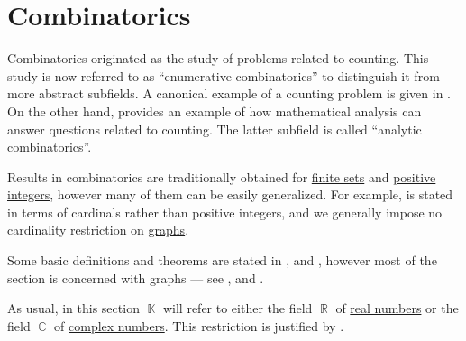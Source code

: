 \section{Combinatorics}\label{sec:combinatorics}

Combinatorics originated as the study of problems related to counting. This study is now referred to as \enquote{enumerative combinatorics} to distinguish it from more abstract subfields. A canonical example of a counting problem is given in . On the other hand,  provides an example of how mathematical analysis can answer questions related to counting. The latter subfield is called \enquote{analytic combinatorics}.

Results in combinatorics are traditionally obtained for \hyperref[def:set_finiteness]{finite sets} and \hyperref[def:integer_signum]{positive integers}, however many of them can be easily generalized. For example,  is stated in terms of cardinals rather than positive integers, and we generally impose no cardinality restriction on \hyperref[def:directed_graph]{graphs}.

Some basic definitions and theorems are stated in ,  and , however most of the section is concerned with graphs --- see ,  and .

As usual, in this section \( \BbbK \) will refer to either the field \( \BbbR \) of \hyperref[def:real_numbers]{real numbers} or the field \( \BbbC \) of \hyperref[def:real_numbers]{complex numbers}. This restriction is justified by .

